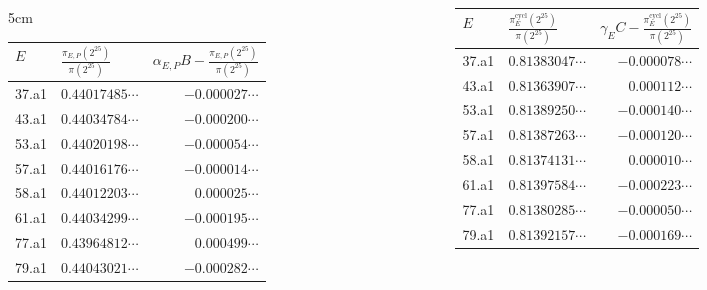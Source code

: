 \documentclass[10pt,handout]{beamer} %
\theoremstyle{definition}
\begin{document}
\begin{frame}
\begin{tiny}\begin{columns}[c]
\begin{column} {5cm}
\begin{tabular}{|l|l|r|}
\hline
 $E$ &\!\! $\frac{\pi_{E,P}(2^{25})}{\pi(2^{25})}$\hspace*{-2mm}\!\!&\hspace*{-1.8mm}\!\! $\alpha_{E,P}B-\frac{\pi_{E,P}(2^{25})}{\pi(2^{25})}$\hspace*{-2mm}\!\!\\
\hline
37.a1 &$0.44017485\cdots$\hspace*{-2mm}&   $-0.000027\cdots$\\
43.a1 &$0.44034784\cdots$\hspace*{-2mm}&   $-0.000200\cdots$\\
53.a1 &$0.44020198\cdots$\hspace*{-2mm}&   $-0.000054\cdots$\\
57.a1 &$0.44016176\cdots$\hspace*{-2mm}&   $-0.000014\cdots$\\
58.a1 &$0.44012203\cdots$\hspace*{-2mm}&    $0.000025\cdots$\\
61.a1 &$0.44034299\cdots$\hspace*{-2mm}&   $-0.000195\cdots$\\                       
77.a1 &$0.43964812\cdots$\hspace*{-2mm}&    $0.000499\cdots$\\
79.a1 &$0.44043021\cdots$\hspace*{-2mm}&  $ -0.000282\cdots$\\
\hline
\end{tabular}
\end{column}\pause
\begin{column}{5cm}
\begin{tabular}{|l|l|r|}
\hline
 $E$ &\!\! $\frac{\pi_E^{\text{cycl}}(2^{25})}{\pi(2^{25})}$\hspace*{-2mm}\!\!&\hspace*{-1.5mm}\!\! $\gamma_EC-\frac{\pi_E^{\text{cycl}}(2^{25})}{\pi(2^{25})}$\hspace*{-2mm}\!\!\\
\hline
37.a1 &$0.81383047\cdots$&   $-0.000078\cdots$\\
43.a1 &$0.81363907\cdots$&   $ 0.000112\cdots$\\
53.a1 &$0.81389250\cdots$&   $-0.000140\cdots$\\
57.a1 &$0.81387263\cdots$&   $-0.000120\cdots$\\
58.a1 &$0.81374131\cdots$&   $ 0.000010\cdots$\\
61.a1 &$0.81397584\cdots$&   $-0.000223\cdots$\\                       
77.a1 &$0.81380285\cdots$&   $-0.000050\cdots$\\
79.a1 &$0.81392157\cdots$&   $-0.000169\cdots$\\\hline
\end{tabular}\end{column}\end{columns}
\end{tiny}
\end{frame}
\end{document}

